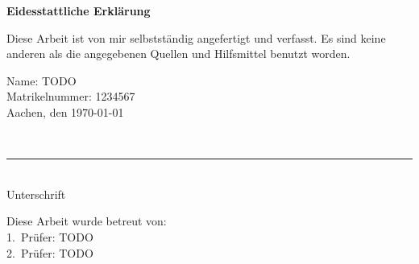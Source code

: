 \thispagestyle{empty}

\begin{center}
    \textbf{\Large Eidesstattliche Erklärung}\\
\end{center}
\noindent
Diese Arbeit ist von mir selbstständig angefertigt und verfasst.
Es sind keine anderen als die angegebenen Quellen und Hilfsmittel benutzt worden.

\begin{multicols}{2}
    \noindent
    Name: TODO\\
    Matrikelnummer: 1234567\\
    Aachen, den \today\\
    \columnbreak

    ~\\
    \noindent\rule{5.5cm}{0.4pt}\\
    Unterschrift\\
\end{multicols}

\noindent Diese Arbeit wurde betreut von:\\
1.\ Prüfer: TODO\\
2.\ Prüfer: TODO\\

\pagebreak
